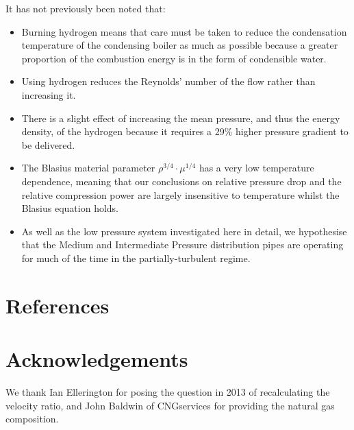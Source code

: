 \documentclass[5p]{elsarticle} %
\begin{document}
It has not previously been noted that:
\begin{itemize}

    \item Burning hydrogen means that care must be taken to reduce the condensation temperature of the condensing boiler as much as possible because a greater proportion of the combustion energy is in the form of condensible water.
    \item Using hydrogen reduces the Reynolds' number of the flow rather than increasing it.  
    \item There is a slight effect of increasing the mean pressure, and thus the energy density, of the hydrogen because it requires a 29\% higher pressure gradient to be delivered.
    \item The Blasius material parameter $\rho^{3/4} \cdot \mu^{1/4}$ has a very low temperature dependence, meaning that our conclusions on relative pressure drop and the relative compression power are largely insensitive to temperature whilst the Blasius equation holds.
    \item As well as the low pressure system investigated here in detail, we hypothesise that the Medium and Intermediate Pressure distribution pipes are operating for much of the time in the partially-turbulent regime.
\end{itemize}

\section{References}


\section*{Acknowledgements}
\label{sec:ending}

We thank Ian Ellerington for posing the question in 2013 of recalculating the velocity ratio, and John Baldwin of CNGservices for providing the natural gas composition.
\end{document}
